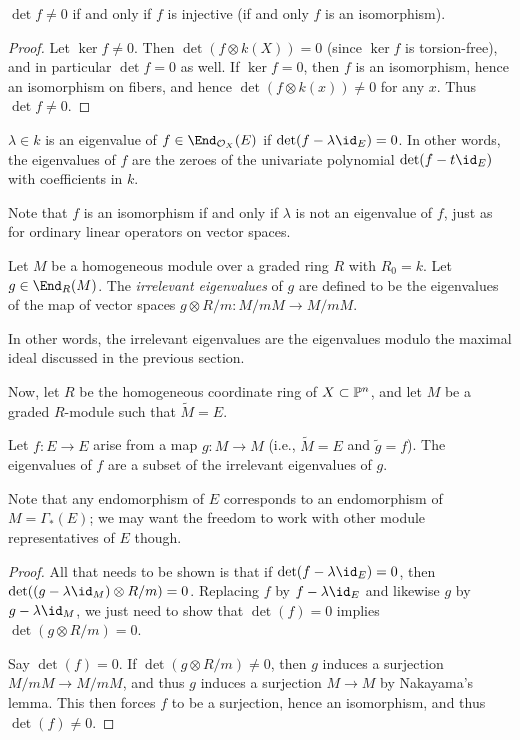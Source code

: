 \documentclass[12pt]{article}
\let\l\lambda
\let\wtilde\widetilde
\def\O{\mathcal O}
\numberwithin{equation}{section}
\theoremstyle{theorem}
\numberwithin{thm}{section}
\theoremstyle{definition}
\begin{document}
\begin{lem}
$\det f \neq 0 $ if and only if $f$ is injective (if and only $f$ is an isomorphism).
\end{lem}

\begin{proof}
  Let $\ker f \neq 0$. %
 Then $\det(f\otimes k(X))= 0$ (since $\ker f$ is torsion-free), and in particular  $\det f = 0$ as well.
If $\ker f = 0$, then
$f$ is an isomorphism, hence an isomorphism on fibers, and hence
$\det(f\otimes k(x)) \neq 0$ for any $x$. Thus $\det f\neq 0$.
\end{proof}

\begin{dfn}
$\l \in k$ is an eigenvalue of $f \in \End_{\O_X}(E)$ if $\det(f-\l \id_E)= 0$. In other words, the eigenvalues of $f$ are the zeroes of the univariate polynomial $\det(f-t\id _E)$ with coefficients in $k$.
\end{dfn}

Note that $f$ is an isomorphism if and only if $\l$ is not an eigenvalue of $f$, just as for ordinary linear operators on vector spaces.

\begin{dfn}
Let $M$ be a homogeneous module over a graded ring $R$ with $R_0=k$.
Let $g \in \End_R(M)$. The \emph{irrelevant eigenvalues} of $g$ are defined to be the eigenvalues of the map of vector spaces $g\otimes R/m:M/mM \to M/mM$.
\end{dfn}

In other words, the irrelevant eigenvalues are the eigenvalues modulo the maximal ideal discussed in the previous section.


Now, let $R$ be the homogeneous coordinate ring of $X\subset \P^n$, and let $M$ be a graded $R$-module such that $\wtilde M=E$.

\begin{lem}
Let $f:E\to E$ arise from a map $g:M\to M$ (i.e., $\wtilde M = E$ and $\wtilde g = f$).
The eigenvalues of $f$ are a subset of the irrelevant eigenvalues of $g$.
\end{lem}

Note that any endomorphism of $E$ corresponds to an endomorphism of $M=\Gamma_*(E)$; we may want the freedom to work with other module representatives of $E$ though.

\begin{proof}
  All that needs to be shown is that if $\det(f-\l \id_E) =0$, then $\det((g-\l \id_M)\otimes R/m)=0$.
Replacing $f$ by $f-\l \id_E$ and likewise $g$ by $g-\l\id_M$, we just need to show that $\det(f)=0$ implies $\det(g\otimes R/m)=0$.

Say $\det(f)=0$.
If $\det(g\otimes R/m)\neq 0$, then $g$ induces a surjection $M/mM\to M/mM$, and thus $g$ induces a surjection $M\to M$ by Nakayama's lemma. This then forces $f$ to be a surjection, hence an isomorphism, and thus $\det(f)\neq 0$.
\end{proof}
\end{document}
